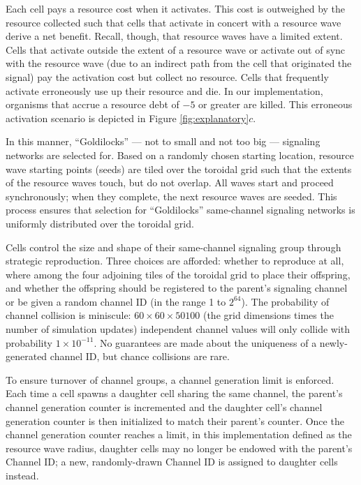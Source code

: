 Each cell pays a resource cost when it activates.
This cost is outweighed by the resource collected such that cells that activate in concert with a resource wave derive a net benefit.
Recall, though, that resource waves have a limited extent.
Cells that activate outside the extent of a resource wave or activate out of sync with the resource wave (due to an indirect path from the cell that originated the signal) pay the activation cost but collect no resource.
Cells that frequently activate erroneously use up their resource and die.
In our implementation, organisms that accrue a resource debt of $-5$ or greater are killed.
This erroneous activation scenario is depicted in Figure \ref{fig:explanatory}$c$.

In this manner, ``Goldilocks'' --- not to small and not too big --- signaling networks are selected for.
Based on a randomly chosen starting location, resource wave starting points (seeds) are tiled over the toroidal grid such that the extents of the resource waves touch, but do not overlap.
All waves start and proceed synchronously;
when they complete, the next resource waves are seeded.
This process ensures that selection for ``Goldilocks'' same-channel signaling networks is uniformly distributed over the toroidal grid.

Cells control the size and shape of their same-channel signaling group through strategic reproduction.
Three choices are afforded: whether to reproduce at all, where among the four adjoining tiles of the toroidal grid to place their offspring, and whether the offspring should be registered to the parent's signaling channel or be given a random channel ID (in the range 1 to $2^{64}$).
The probability of channel collision is miniscule: $60 \times 60 \times 50100$ (the grid dimensions times the number of simulation updates) independent channel values will only collide with probability $1 \times 10^{-11}$.
No guarantees are made about the uniqueness of a newly-generated channel ID, but chance collisions are rare.

To ensure turnover of channel groups, a channel generation limit is enforced.
Each time a cell spawns a daughter cell sharing the same channel, the parent's channel generation counter is incremented and the daughter cell's channel generation counter is then initialized to match their  parent's counter.
Once the channel generation counter reaches a limit, in this implementation defined as the resource wave radius, daughter cells may no longer be endowed with the parent's Channel ID; a new, randomly-drawn Channel ID is assigned to daughter cells instead.

